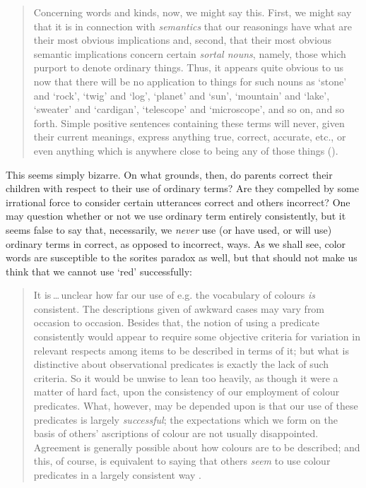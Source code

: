 \documentclass[11pt]{standalone} \newif\ifstandlone \standalonetrue
\newenvironment{squote}{%
	\begin{quote}\begin{singlespace}%
	}{%
	\end{singlespace}\end{quote}}
\begin{document}
\begin{spacing}{1.5}
\begin{squote}
Concerning words and kinds, now, we might say this.  First, we might
say that it is in connection with \emph{semantics} that our reasonings have
what are their most obvious implications and, second, that their most
obvious semantic implications concern certain \emph{sortal nouns}, namely,
those which purport to denote ordinary things.  Thus, it appears quite
obvious to us now that there will be no application to things for such
nouns as `stone' and `rock', `twig' and `log', `planet' and `sun',
`mountain' and `lake', `sweater' and `cardigan', `telescope' and
`microscope', and so on, and so forth.  Simple positive sentences
containing these terms will never, given their current meanings,
express anything true, correct, accurate, etc., or even anything which
is anywhere close to being any of those things
(\citeyear[148]{unger1979}).
\end{squote}

This seems simply bizarre.  On what grounds, then, do parents correct
their children with respect to their use of ordinary terms?  Are they
compelled by some irrational force to consider certain utterances
correct and others incorrect?  One may question whether or not we use
ordinary term entirely consistently, but it seems false to say that,
necessarily, we {\em never} use (or have used, or will use) ordinary
terms in correct, as opposed to incorrect, ways.  As we shall see,
color words are susceptible to the sorites paradox as well, but that
should not make us think that we cannot use `red' successfully:

\begin{squote}
It is\,\ldots\,unclear how far our use of e.g. the vocabulary of
colours \emph{is} consistent.  The descriptions given of awkward cases
may vary from occasion to occasion.  Besides that, the notion of using
a predicate consistently would appear to require some objective
criteria for variation in relevant respects among items to be
described in terms of it; but what is distinctive about observational
predicates is exactly the lack of such criteria.  So it would be
unwise to lean too heavily, as though it were a matter of hard fact,
upon the consistency of our employment of colour predicates.  What,
however, may be depended upon is that our use of these predicates is
largely \emph{successful}; the expectations which we form on the basis
of others' ascriptions of colour are not usually disappointed.
Agreement is generally possible about how colours are to be described;
and this, of course, is equivalent to saying that others \emph{seem}
to use colour predicates in a largely consistent way
\citep[361]{wright1975}.
\end{squote}


\end{spacing}
\end{document}
